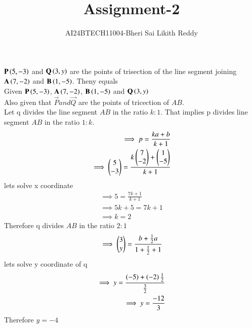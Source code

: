 \documentclass[journal]{IEEEtran}
\begin{document}

\onecolumn
\newpage
\title{Assignment-2}
\author{AI24BTECH11004-Bheri Sai Likith Reddy}
\maketitle
 $\mathbf{P}\left(5,-3\right)$ and $\mathbf{Q}\left(3,y\right)$ are the points of trisection of the line segment joining $\mathbf{A}\left(7,-2\right)$ and $\mathbf{B}\left(1,-5\right)$. Theny equals\\
\solution Given $\mathbf{P}\left(5,-3\right)$, $\mathbf{A}\left(7,-2\right)$, $\mathbf{B}\left(1,-5\right)$ and $\mathbf{Q}\left(3,y\right)$\\
Also given that $\vec{P} and \vec{Q} $ are the points of tricection of $AB$.\\
Let q divides the line segment $AB$ in the ratio $k:1$.
That implies p divides line segment $AB$ in the ratio $1:k$.
\begin{align}
\implies p = \frac{ka+b}{k+1}\\
\implies \begin{pmatrix}5\\ -3\end{pmatrix}=\frac{k\begin{pmatrix}7\\ -2\end{pmatrix}+\begin{pmatrix}1\\ -5\end{pmatrix}}{k+1}\\
\end{align}
lets solve x coordinate
\begin{align}
\implies 5=\frac{7k+1}{k+1}\\
\implies 5k+5=7k+1\\
\implies k=2
\end{align}
Therefore q divides $AB$ in the ratio $2:1$\\
\begin{align}
\implies \begin{pmatrix}3\\ y\end{pmatrix}=\frac{b+\frac{1}{2}a}{1+\frac{1}{2}+1 }\\
\end{align}
lets solve y coordinate of q
\begin{align}
\implies y=\frac{\left(-5\right)+\left(-2\right)\frac{1}{2}}{\frac{3}{2}}\\
\implies y=\frac{-12}{3}
\end{align}
Therefore $y=-4$
\end{document}
